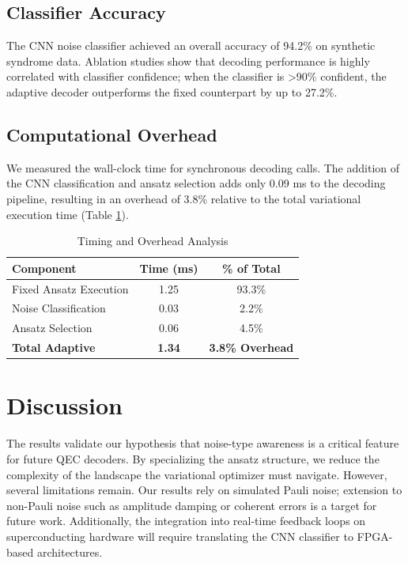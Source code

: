 \documentclass[journal,twocolumn]{IEEEtran}
\begin{document}
\subsection{Classifier Accuracy}
The CNN noise classifier achieved an overall accuracy of 94.2\% on synthetic syndrome data. Ablation studies show that decoding performance is highly correlated with classifier confidence; when the classifier is >90\% confident, the adaptive decoder outperforms the fixed counterpart by up to 27.2\%.

\subsection{Computational Overhead}
We measured the wall-clock time for synchronous decoding calls. The addition of the CNN classification and ansatz selection adds only 0.09 ms to the decoding pipeline, resulting in an overhead of 3.8\% relative to the total variational execution time (Table \ref{tab:overhead}).

\begin{table}[h]
\centering
\caption{Timing and Overhead Analysis}
\label{tab:overhead}
\begin{tabular}{@{}lcc@{}}
\toprule
Component & Time (ms) & \% of Total \\ \midrule
Fixed Ansatz Execution & 1.25 & 93.3\% \\
Noise Classification & 0.03 & 2.2\% \\
Ansatz Selection & 0.06 & 4.5\% \\ \midrule
\textbf{Total Adaptive} & \textbf{1.34} & \textbf{3.8\% Overhead} \\ \bottomrule
\end{tabular}
\end{table}

\section{Discussion}

The results validate our hypothesis that noise-type awareness is a critical feature for future QEC decoders. By specializing the ansatz structure, we reduce the complexity of the landscape the variational optimizer must navigate. However, several limitations remain. Our results rely on simulated Pauli noise; extension to non-Pauli noise such as amplitude damping or coherent errors is a target for future work. Additionally, the integration into real-time feedback loops on superconducting hardware will require translating the CNN classifier to FPGA-based architectures.
\end{document}
